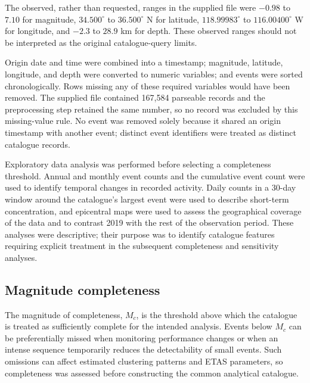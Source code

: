 The observed, rather than requested, ranges in the supplied file were
$-0.98$ to $7.10$ for magnitude, $34.500^\circ$ to $36.500^\circ$ N for
latitude, $118.99983^\circ$ to $116.00400^\circ$ W for longitude, and
$-2.3$ to $28.9$ km for depth. These observed ranges should not be interpreted
as the original catalogue-query limits.

Origin date and time were combined into a timestamp; magnitude, latitude,
longitude, and depth were converted to numeric variables; and events were
sorted chronologically. Rows missing any of these required variables would
have been removed. The supplied file contained 167,584 parseable records and
the preprocessing step retained the same number, so no record was excluded by
this missing-value rule. No event was removed solely because it shared an
origin timestamp with another event; distinct event identifiers were treated
as distinct catalogue records.

Exploratory data analysis was performed before selecting a completeness
threshold. Annual and monthly event counts and the cumulative event count
were used to identify temporal changes in recorded activity. Daily counts in
a 30-day window around the catalogue's largest event were used to describe
short-term concentration, and epicentral maps were used to assess the
geographical coverage of the data and to contrast 2019 with the rest of the
observation period. These analyses were descriptive; their purpose was to
identify catalogue features requiring explicit treatment in the subsequent
completeness and sensitivity analyses.

\subsection{Magnitude completeness}
\label{sec:magnitude_completeness}

The magnitude of completeness, $M_c$, is the threshold above which the
catalogue is treated as sufficiently complete for the intended analysis.
Events below $M_c$ can be preferentially missed when monitoring performance
changes or when an intense sequence temporarily reduces the detectability of
small events. Such omissions can affect estimated clustering patterns and
ETAS parameters, so completeness was assessed before constructing the common
analytical catalogue.

